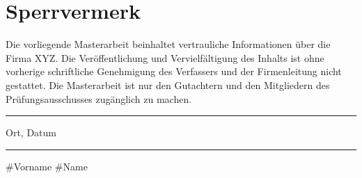 \section*{Sperrvermerk}
Die vorliegende Masterarbeit beinhaltet vertrauliche Informationen über die Firma
XYZ. Die Veröffentlichung und Vervielfältigung des Inhalts ist ohne vorherige schriftliche
Genehmigung des Verfassers und der Firmenleitung nicht gestattet. Die Masterarbeit
ist nur den Gutachtern und den Mitgliedern des Prüfungsausschusses zugänglich zu machen.\\[20mm]
\begin{minipage}{0.45\textwidth}
\noindent\rule{\textwidth}{0.4pt}
Ort, Datum
\end{minipage}
\hfill
\begin{minipage}{0.45\textwidth}
\begin{flushleft}
\noindent\rule{\textwidth}{0.4pt}
\#Vorname \#Name 
\end{flushleft}
\end{minipage}
